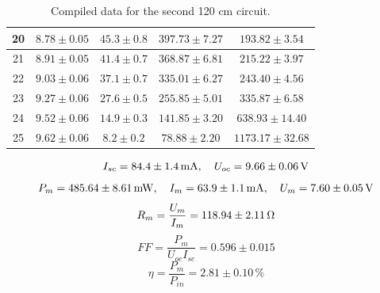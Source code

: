 \begin{table}[!h]
\begin{center}
\begin{tabular}{|c|c|c|c|c|}
\hline
20	&	$8.78 \pm 0.05$	&	$45.3 \pm 0.8$	&	$397.73 \pm 7.27$	&	$193.82 \pm 3.54$	\\
\hline
21	&	$8.91 \pm 0.05$	&	$41.4 \pm 0.7$	&	$368.87 \pm 6.81$	&	$215.22 \pm 3.97$	\\
\hline
22	&	$9.03 \pm 0.06$	&	$37.1 \pm 0.7$	&	$335.01 \pm 6.27$	&	$243.40 \pm 4.56$	\\
\hline
23	&	$9.27 \pm 0.06$	&	$27.6 \pm 0.5$	&	$255.85 \pm 5.01$	&	$335.87 \pm 6.58$	\\
\hline
24	&	$9.52 \pm 0.06$	&	$14.9 \pm 0.3$	&	$141.85 \pm 3.20$	&	$638.93 \pm 14.40$	\\
\hline
25	&	$9.62 \pm 0.06$	&	$8.2 \pm 0.2$	&	$78.88 \pm 2.20$	&	$1173.17 \pm 32.68$	\\
\hline
\end{tabular}
\caption{Compiled data for the second 120 cm circuit.}
\label{tab-com-2}
\end{center}
\end{table}

$$I_{sc}=84.4\pm1.4\,{\rm mA},\quad U_{oc}=9.66\pm0.06\,{\rm V}$$
$$P_m=485.64\pm8.61\,{\rm mW},\quad I_m=63.9\pm1.1\,{\rm mA},\quad U_m=7.60\pm0.05\,{\rm V}$$
$$R_m=\frac{U_m}{I_m}=118.94\pm2.11\,{\rm \Omega}$$
$$FF=\frac{P_m}{U_{oc}I_{sc}}=0.596\pm0.015$$
$$\eta=\frac{P_m}{P_{in}}=2.81\pm0.10\,\%$$
$$$$

